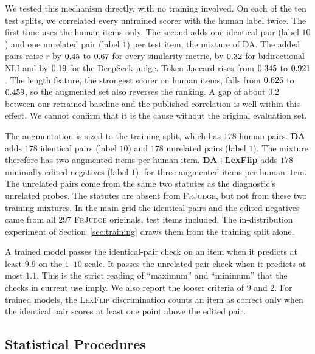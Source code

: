 \documentclass{BVP_JCLLT}
\newcommand{\rev}[1]{#1}
\newcommand{\rev}[1]{{\color{revcol}#1}}
\begin{document}
{\rev{We tested this mechanism directly, with no training involved. On each of
the ten test splits, we correlated every untrained scorer with the human label
twice. The first time uses the human items only. The second adds one identical
pair (label $10$) and one unrelated pair (label $1$) per test item, the mixture
of \textsc{DA}. The added pairs raise $r$ by $0.45$ to $0.67$
for every similarity metric, by $0.32$ for bidirectional NLI and by
$0.19$ for the DeepSeek judge. Token Jaccard rises from
$0.345$ to $0.921$. The length feature, the strongest scorer on
human items, falls from $0.626$ to $0.459$, so the augmented set
also reverses the ranking. A gap of about $0.2$ between our retrained baseline
and the published correlation is well within this effect. We cannot confirm
that it is the cause without the original evaluation set.}

The augmentation is sized to the training split, which has $178$ human pairs.
\textbf{DA} adds $178$ identical pairs (label $10$) and $178$ unrelated pairs
(label $1$). The mixture therefore has two augmented items per human item.
\textbf{DA+LexFlip} adds $178$ minimally edited negatives (label $1$), for three
augmented items per human item. The unrelated pairs come from the same two
statutes as the diagnostic's unrelated probes. The statutes are absent from
\textsc{FrJudge}, but not from these two training mixtures. In the main grid the
identical pairs and the edited negatives came from all $297$ \textsc{FrJudge}
originals, test items included. The in-distribution experiment of
Section~\ref{sec:training} draws them from the training split alone.

A trained model passes the identical-pair check on an item when it predicts at
least $9.9$ on the $1$--$10$ scale. It passes the unrelated-pair check when it
predicts at most $1.1$. This is the strict reading of ``maximum'' and
``minimum'' that the checks in current use imply. We also report the looser
criteria of $9$ and $2$. For trained models, the \textsc{LexFlip}
discrimination counts an item as correct only when the identical pair scores at
least one point above the edited pair.}

\subsection{Statistical Procedures}\label{sec:stats}
\end{document}
